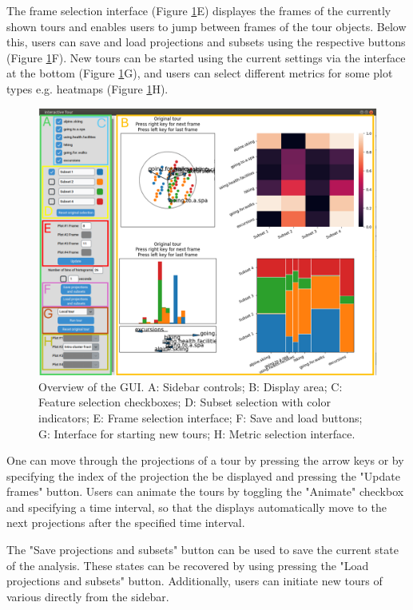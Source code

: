 \documentclass[article]{ajs}
\begin{document}
The frame selection interface (Figure \ref{fig:GUI_overview}E) displayes the frames of the currently shown tours and enables users to jump between frames of the tour objects. Below this, users can save and load projections and subsets using the respective buttons (Figure \ref{fig:GUI_overview}F). New tours can be started using the current settings via the interface at the bottom (Figure \ref{fig:GUI_overview}G), and users can select different metrics for some plot types e.g. heatmaps (Figure \ref{fig:GUI_overview}H).

\begin{figure}[h!]
    \centering
    \includegraphics[width=1\textwidth]{GUI_overview.png}
    \caption{Overview of the GUI. A: Sidebar controls; B: Display area;  C: Feature selection checkboxes; D: Subset selection with color indicators; E: Frame selection interface; F: Save and load buttons; G: Interface for starting new tours; H: Metric selection interface.}
    \label{fig:GUI_overview}
\end{figure}


One can move through the projections of a tour by pressing the arrow keys or by specifying the index of the projection the be displayed and pressing the "Update frames" button. Users can animate the tours by toggling the "Animate" checkbox and specifying a time interval, so that the displays automatically move to the next projections after the specified time interval.

The "Save projections and subsets" button can be used to save the current state of the analysis. These states can be recovered by using pressing the "Load projections and subsets" button. Additionally, users can initiate new tours of various directly from the sidebar.
\end{document}
